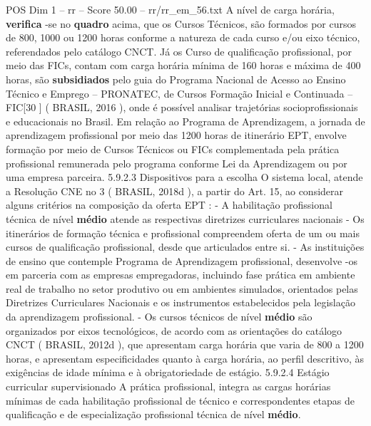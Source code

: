 \begin{textsample}{POS Dim 1 – rr – Score 50.00 – rr/rr\_em\_56.txt}  \label{ex:f1_pos_213}
A nível de carga horária, \textbf{verifica} -se no \textbf{quadro} acima, que os Cursos Técnicos, são formados por cursos de 800, 1000 ou 1200 horas conforme a natureza de cada curso e/ou eixo técnico, referendados pelo catálogo CNCT.
Já os Curso de qualificação profissional, por meio das FICs, contam com carga horária mínima de 160 horas e máxima de 400 horas, são \textbf{subsidiados} pelo guia do Programa Nacional de Acesso ao Ensino Técnico e Emprego – PRONATEC, de Cursos Formação Inicial e Continuada – FIC[30 ] ( BRASIL, 2016 ), onde é possível analisar trajetórias socioprofissionais e educacionais no Brasil.
Em relação ao Programa de Aprendizagem, a jornada de aprendizagem profissional por meio das 1200 horas de itinerário EPT, envolve formação por meio de Cursos Técnicos ou FICs complementada pela prática profissional remunerada pelo programa conforme Lei da Aprendizagem ou por uma empresa parceira. 5.9.2.3 Dispositivos para a escolha O sistema local, atende a Resolução CNE no 3 ( BRASIL, 2018d ), a partir do Art. 15, ao considerar alguns critérios na composição da oferta EPT : - A habilitação profissional técnica de nível \textbf{médio} atende as respectivas diretrizes curriculares nacionais - Os itinerários de formação técnica e profissional compreendem oferta de um ou mais cursos de qualificação profissional, desde que articulados entre si. - As instituições de ensino que contemple Programa de Aprendizagem profissional, desenvolve -os em parceria com as empresas empregadoras, incluindo fase prática em ambiente real de trabalho no setor produtivo ou em ambientes simulados, orientados pelas Diretrizes Curriculares Nacionais e os instrumentos estabelecidos pela legislação da aprendizagem profissional. - Os cursos técnicos de nível \textbf{médio} são organizados por eixos tecnológicos, de acordo com as orientações do catálogo CNCT ( BRASIL, 2012d ), que apresentam carga horária que varia de 800 a 1200 horas, e apresentam especificidades quanto à carga horária, ao perfil descritivo, às exigências de idade mínima e à obrigatoriedade de estágio. 5.9.2.4 Estágio curricular supervisionado A prática profissional, integra as cargas horárias mínimas de cada habilitação profissional de técnico e correspondentes etapas de qualificação e de especialização profissional técnica de nível \textbf{médio}.

\end{textsample}
